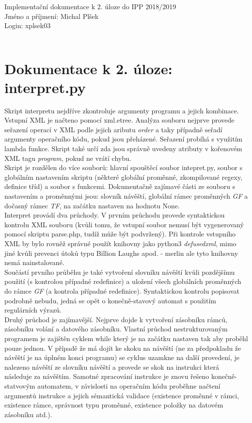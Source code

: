 \documentclass[10pt]{article}
\begin{document}
\noindent
Implementační dokumentace k 2. úloze do IPP 2018/2019
\\
Jméno a příjmení: Michal Plšek\\
Login: xplsek03\\\\
\section*{Dokumentace k 2. úloze: interpret.py}
Skript interpretu nejdříve zkontroluje argumenty programu a jejich kombinace. Vstupní XML je načteno pomocí xml.etree. Analýza souboru nejprve provede seřazení operací v XML podle jejich aributu \textit{order} a taky případně seřadí argumenty operačního kódu, pokud jsou přeházené. Seřazení probíhá s využitím lambda funkce. Skript také určí zda jsou správně uvedeny atributy v kořenovém XML tagu \textit{program}, pokud ne vrátí chybu.
\\
Skript je rozdělen do více souborů: hlavní spouštěcí soubor intepret.py, soubor s globálním nastavením skriptu (některé globální proměnné, zkompilované regexy, definice tříd) a soubor s funkcemi. Dokumentačně zajímavé části ze souboru s nastavením a proměnnými jsou: slovník návěští, globální rámec proměnných \textit{GF} a dočasný rámec \textit{TF}, na začátku nastaven na hodnotu None.\\
Interpret provádí dva průchody. V prvním průchodu provede syntaktickou kontrolu XML souboru (kvůli tomu, že vstupní soubor nemusí být vygenerovaný pomocí skriptu parse.php, tudíž může být podvržený). Při kontrole vstupního XML by bylo rovněž správné použít knihovny jako python3 \textit{defusedxml}, mimo jiné kvůli prevenci útoků typu Billion Laughs apod. - merlin ale tyto knihovny nemá nainstalované.\\
Součástí prvního průběhu je také vytvoření slovníku návěští kvůli pozdějšímu použití (s kontrolou případné redefinice) a uložení všech globálních proměnných do rámce \textit{GF} (a kontrola případné redefinice). Syntaktickou kontrolu popisovat podrobně nebudu, jedná se opět o konečně-stavový automat s použitím regulárních výrazů.\\
Druhý průchod je zajímavější. Nejprve dojde k vytvoření zásobníku rámců, zásobníku volání a datového zásobníku. Vlastní průchod nestrukturovaným programem je zajištěn cyklem while který je na začátku nastaven tak aby proběhl pouze jednou. V případě že má dojít ke skoku na návěští (ne za předpokladu že návěští je na úplném konci programu) se cyklus uzamkne na další provedení, je nalezeno návěští ze slovníku návěští a provede se skok na instrukci která následuje za návěštím. Samotné zpracování instrukce je znovu řešeno konečně-statvovým automatem, v závislosti na operačním kódu proběhne načtení argumentů instrukce a jejich sémantická validace (existence proměnné v rámci, existence rámce, správnost typu proměnné, existence položky na datovém zásobníku atd.).\\
\end{document}
